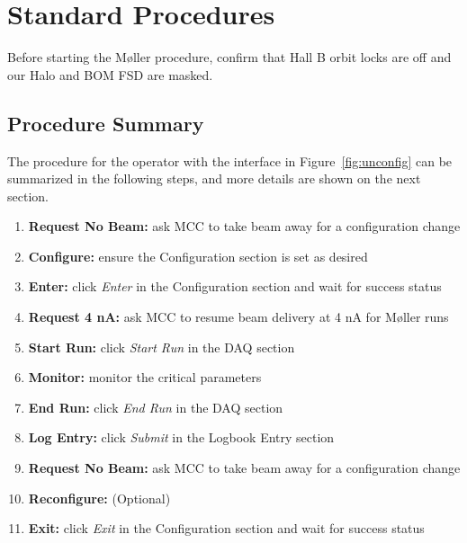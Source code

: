 \documentclass[amsmath,amssymb,notitlepage,12pt]{revtex4}
\begin{document}
\newpage

\section{Standard Procedures}\label{sec:user}
Before starting the M{\o}ller procedure, confirm that Hall B orbit locks are off and our Halo and BOM FSD are masked.
\subsection{Procedure Summary}
The procedure for the operator with the interface in Figure~\ref{fig:unconfig} can be summarized in the following steps, and more details are shown on the next section.
\begin{enumerate}
\vspace{-4mm}\item {\bf Request No Beam:}  ask MCC to take beam away for a configuration change
\vspace{-4mm}\item {\bf Configure:}  ensure the Configuration section is set as desired
\vspace{-4mm}\item {\bf Enter:} click {\em Enter} in the Configuration section and wait for success status
\vspace{-4mm}\item {\bf Request 4 nA:} ask MCC to resume beam delivery at 4 nA for M{\o}ller runs
\vspace{-4mm}\item {\bf Start Run:} click {\em Start Run} in the DAQ section
\vspace{-4mm}\item {\bf Monitor:} monitor the critical parameters
\vspace{-4mm}\item {\bf End Run:} click {\em End Run} in the DAQ section
\vspace{-4mm}\item {\bf Log Entry:} click {\em Submit} in the Logbook Entry section 
\vspace{-4mm}\item {\bf Request No Beam:} ask MCC to take beam away for a configuration change
\vspace{-4mm}\item {\bf Reconfigure:} (Optional)
\vspace{-4mm}\item {\bf Exit:} click {\em Exit} in the Configuration section and wait for success status
\end{enumerate}
\end{document}
